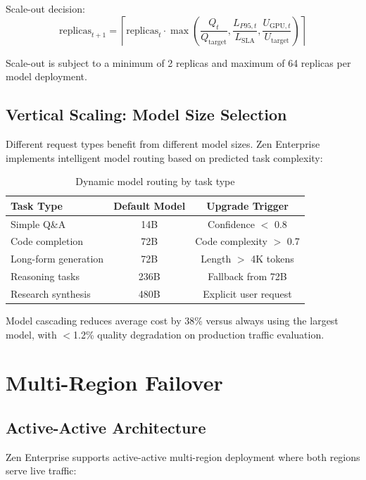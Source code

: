 \documentclass[11pt,a4paper]{article}
\begin{document}
Scale-out decision:
\begin{equation}
\text{replicas}_{t+1} = \left\lceil \text{replicas}_t \cdot \max\!\left(\frac{Q_t}{Q_{\text{target}}}, \frac{L_{P95,t}}{L_{\text{SLA}}}, \frac{U_{\text{GPU},t}}{U_{\text{target}}}\right) \right\rceil
\end{equation}

Scale-out is subject to a minimum of 2 replicas and maximum of 64 replicas per model deployment.

\subsection{Vertical Scaling: Model Size Selection}

Different request types benefit from different model sizes. Zen Enterprise implements intelligent model routing based on predicted task complexity:

\begin{table}[H]
\centering
\caption{Dynamic model routing by task type}
\label{tab:routing}
\begin{tabular}{lcc}
\toprule
Task Type & Default Model & Upgrade Trigger \\
\midrule
Simple Q\&A & 14B & Confidence $<$ 0.8 \\
Code completion & 72B & Code complexity $>$ 0.7 \\
Long-form generation & 72B & Length $>$ 4K tokens \\
Reasoning tasks & 236B & Fallback from 72B \\
Research synthesis & 480B & Explicit user request \\
\bottomrule
\end{tabular}
\end{table}

Model cascading reduces average cost by 38\% versus always using the largest model, with $<$1.2\% quality degradation on production traffic evaluation.

\section{Multi-Region Failover}

\subsection{Active-Active Architecture}

Zen Enterprise supports active-active multi-region deployment where both regions serve live traffic:
\end{document}
